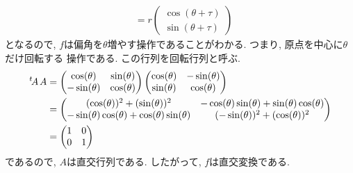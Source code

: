 \begin{example}
\begin{align*}
    &=
    r\begin{pmatrix}\cos(\theta+\tau)\\\sin(\theta+\tau)\end{pmatrix}
  \end{align*}
  となるので, $f$は偏角を$\theta$増やす操作であることがわかる.
  つまり, 原点を中心に$\theta$だけ回転する
  操作である.
  この行列を回転行列と呼ぶ.
  \begin{align*}
    {\left.^{t}\!A\right.}A
    &=
    \begin{pmatrix}\cos(\theta)&\sin(\theta)\\-\sin(\theta)&\cos(\theta)\end{pmatrix}
    \begin{pmatrix}\cos(\theta)&-\sin(\theta)\\\sin(\theta)&\cos(\theta)\end{pmatrix}\\
    &=
    \begin{pmatrix}(\cos(\theta))^2+(\sin(\theta))^2&-\cos(\theta)\sin(\theta)+\sin(\theta)\cos(\theta)\\-\sin(\theta)\cos(\theta)+\cos(\theta)\sin(\theta)&(-\sin(\theta))^2+(\cos(\theta))^2\end{pmatrix}\\
    &=
    \begin{pmatrix}1&0\\0&1\end{pmatrix}
  \end{align*}
  であるので, $A$は直交行列である.
  したがって, $f$は直交変換である.
\end{example}
